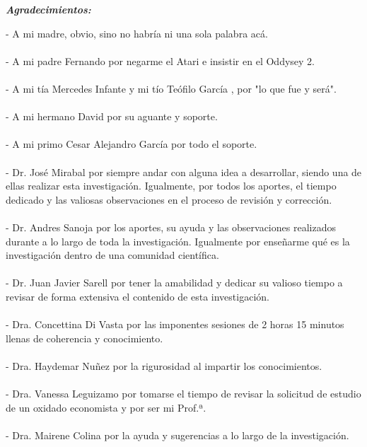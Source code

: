 \documentclass[
  12pt,
  openany]{book}
\begin{document}
\newpage
\begin{center}
\large{\textbf{\emph{\Huge{Agradecimientos:}}}}
\end{center}
\thispagestyle{empty}
\vspace*{2cm}
\thispagestyle{empty}

- A mi madre, obvio, sino no habría ni una sola palabra acá.\\\\
- A mi padre Fernando por negarme el Atari e insistir en el Oddysey 2.\\\\
- A mi tía Mercedes Infante y mi tío Teófilo García \textdagger, por "lo que fue y será".\\\\
- A mi hermano David por su aguante y soporte.\\\\
- A mi primo Cesar Alejandro García por todo el soporte.\\\\
- Dr. José Mirabal por siempre andar con alguna idea a desarrollar, siendo una de ellas realizar esta investigación. Igualmente, por todos los aportes, el tiempo dedicado y las valiosas observaciones en el proceso de revisión y corrección.\\\\
- Dr. Andres Sanoja por los aportes, su ayuda y las observaciones realizados durante a lo largo de toda la investigación. Igualmente por enseñarme qué es la investigación dentro de una comunidad científica.\\\\
- Dr. Juan Javier Sarell por tener la amabilidad y dedicar su valioso tiempo a revisar de forma extensiva el contenido de esta investigación.\\\\
- Dra. Concettina Di Vasta por las imponentes sesiones de 2 horas 15 minutos llenas de coherencia y conocimiento.\\\\
- Dra. Haydemar Nuñez por la rigurosidad al impartir los conocimientos.\\\\
- Dra. Vanessa Leguizamo por tomarse el tiempo de revisar la solicitud de estudio de un oxidado economista y por ser mi Prof.ª.\\\\
- Dra. Mairene Colina por la ayuda y sugerencias a lo largo de la investigación.\\\\
\end{document}
